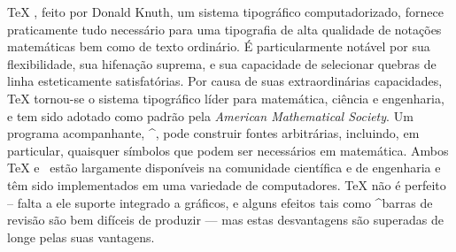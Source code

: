 

{\tighten \TeX{} , feito por Donald Knuth, um sistema tipográfico
computadorizado, fornece praticamente tudo necessário para uma tipografia de
alta qualidade de notações matemáticas bem como de texto ordinário. É
particularmente notável por sua flexibilidade, sua hifenação suprema, e sua
capacidade de selecionar quebras de linha esteticamente satisfatórias. Por causa
de suas extraordinárias capacidades, \TeX{} tornou-se o sistema tipográfico líder
para matemática, ciência e engenharia, e tem sido adotado como padrão pela {\it
American Mathematical Society}. Um programa acompanhante, ^{\Metafont}, pode
construir fontes arbitrárias, incluindo, em particular, quaisquer símbolos que
podem ser necessários em matemática. Ambos \TeX{} e \Metafont\ estão largamente
disponíveis na comunidade científica e de engenharia e têm sido implementados em
uma variedade de computadores. \TeX{} não é perfeito -- falta a ele suporte
integrado a gráficos, e alguns efeitos tais como ^{barras de revisão} são bem
difíceis de produzir --- mas estas desvantagens são superadas de longe pelas
suas vantagens. \par}

